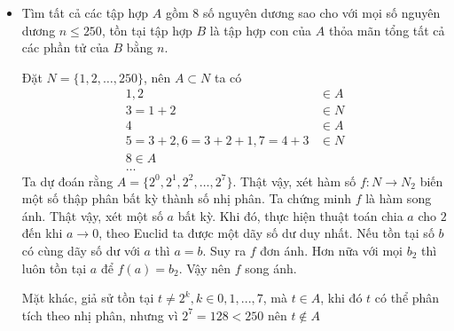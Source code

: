 \documentclass[11pt]{scrartcl}
\begin{document}
\begin{itemize}[label=, leftmargin=0em, itemsep=0.5em]
\begin{proof}
\begin{proof}
            Tương tự với $w \in T_1 \cap T_2$ thì có $A(w) \geq 2$. Từ đó ta suy ra 
            \[
                S \geq a(n - a) + b(a - 1) + 2
            \]
        \end{proof}
        Kết hợp lại hai điều trên ta được 
        \[
        \begin{aligned}
            a + (n - 1)b \geq a(n - a) + b(a - 1) + 2 \lra a &\geq an -a^2 + ab  + 2 -nb\\
             &> (n - a)(a - b) \\
             &> n - a 
        \end{aligned}
        \]
        Suy ra $a > \frac{n}{2}$. Do đó với $u,v,w \notin T_1$ thì $A(u),A(v),A(w) > \frac{n}{2}$. Theo Dirichlet thì tồn tại hai trong số 3 đỉnh trên cùng xuất hiện nhiều hơn 2 lần, mâu thuẫn. Vậy nên $a = b$. Kéo theo $|T_1| = |T_2| =\dots = |T_n|$, hoàn tất chứng minh.
    \end{proof}
    \item \begin{bt}
        Tìm tất cả các tập hợp $A$ gồm 8 số nguyên dương sao cho với mọi số nguyên dương $n \leq 250$, tồn tại tập hợp $B$ là tập hợp con của $A$ thỏa mãn tổng tất cả các phần tử của $B$ bằng $n$.
    \end{bt}
    \begin{sol}
        Đặt $N = \{1,2,\dots,250\}$, nên $A \subset N$ ta có 
        \[
        \begin{aligned}
            1,2 &\in A\\
            3 = 1 + 2 &\in N\\
            4 &\in A\\
            5 = 3 + 2, 6 = 3 + 2 + 1, 7 = 4 + 3 &\in N\\
            8 \in A\\
            \dots
        \end{aligned}
        \]
        Ta dự đoán rằng $A = \{2^0,2^1,2^2,\dots,2^7\}$. Thật vậy, xét hàm số $f: N \to N_2$ biến một số thập phân bất kỳ thành số nhị phân. Ta chứng minh $f$ là hàm song ánh. Thật vậy, xét một số $a$ bất kỳ. Khi đó, thực hiện thuật toán chia $a$ cho $2$ đến khi $a \to 0$, theo Euclid ta được một dãy số dư duy nhất. Nếu tồn tại số $b$ có cùng dãy số dư với $a$ thì $a = b$. Suy ra $f$ đơn ánh. Hơn nữa với mọi $b_2$ thì luôn tồn tại $a$ để $f(a) = b_2$. Vậy nên $f$ song ánh.

        Mặt khác, giả sử tồn tại $t \neq 2^k, k \in 0,1,...,7$, mà $t \in A$, khi đó $t$ có thể phân tích theo nhị phân, nhưng vì $2^7 = 128 < 250$ nên $t \notin A$
         

\end{sol}
\end{itemize}
\end{document}
